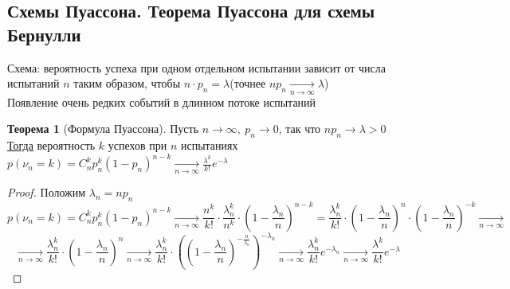 \documentclass[oneside]{book}
\theoremstyle{plain}
\theoremstyle{remark}
\theoremstyle{definition}
\newtheorem{theorem}{Теорема}[section]
\begin{document}
\subsection{Схемы Пуассона. Теорема Пуассона для схемы Бернулли}
\label{sec:org4e5abd2}
Схема: вероятность успеха при одном отдельном испытании зависит от числа испытаний \(n\) таким образом, чтобы \(n \cdot p_n = \lambda\)(точнее \(np_n \xrightarrow[n \to \infty]{} \lambda\)) \\
Появление очень редких событий в длинном потоке испытаний
\begin{theorem}[Формула Пуассона]
Пусть \(n \to \infty,\ p_n \to 0\), так что \(np_n \to \lambda > 0\) \\
\uline{Тогда} вероятность \(k\) успехов при \(n\) испытаниях \(p(\nu_n = k) = C^k_np_n^k(1 - p_n)^{n -k} \xrightarrow[n \to \infty]{} \frac{\lambda^k}{k!}e^{-\lambda}\)
\end{theorem}
\begin{proof}
Положим \(\lambda_n = np_n\)
\[ p(\nu_n = k) = C^k_np_n^k(1 - p_n)^{n - k} \xrightarrow[n \to \infty]{} \frac{n^k}{k!}\cdot \frac{\lambda_n^k}{n^k}\cdot\left(1 - \frac{\lambda_n}{n}\right)^{n - k} = \frac{\lambda_n^k}{k!}\cdot\left(1 - \frac{\lambda_n}{n}\right)^n\cdot\left(1 - \frac{\lambda_n}{n}\right)^{-k} \xrightarrow[n \to \infty]{} \]
\[ \xrightarrow[n \to \infty]{} \frac{\lambda_n^k}{k!}\cdot\left(1 - \frac{\lambda_n}{n}\right)^n \xrightarrow[n \to \infty]{} \frac{\lambda_n^k}{k!}\cdot\left(\left(1 - \frac{\lambda_n}{n}\right)^{-\frac{n}{\lambda_n}}\right)^{-\lambda_n} \xrightarrow[n \to \infty]{} \frac{\lambda_n^k}{k!}e^{-\lambda_n} \xrightarrow[n \to \infty]{} \frac{\lambda^k}{k!}e^{-\lambda} \]
\end{proof}
\end{document}
